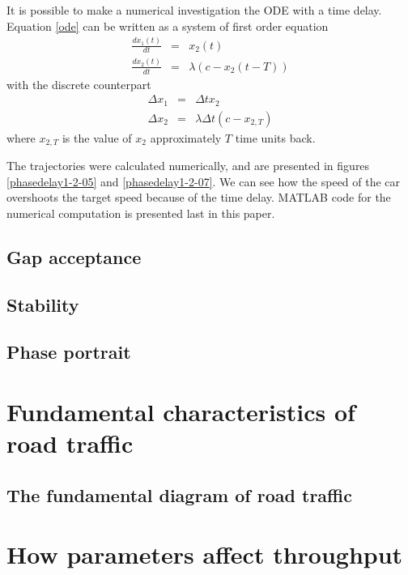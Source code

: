 \documentclass[11pt,a4paper]{article}
\begin{document}
It is possible to make a numerical investigation the ODE with a time delay.
Equation \ref{ode} can be written as a system of first order equation
\begin{eqnarray*}
\frac{dx_1(t)}{dt} &=& x_2(t) \\
\frac{dx_2(t)}{dt} &=& \lambda \left( c - x_2(t-T) \right)
\end{eqnarray*}
with the discrete counterpart
\begin{eqnarray*}
\Delta x_1 &=& \Delta t x_2 \\
\Delta x_2 &=& \lambda \Delta t ( c - x_{2,T})
\end{eqnarray*}
where $x_{2,T}$ is the value of $x_2$ approximately $T$ time units back.


The trajectories were calculated numerically, and are presented in figures
\ref{phasedelay1-2-05} and \ref{phasedelay1-2-07}. We can see how the speed of
the car overshoots the target speed because of the time delay. MATLAB code for
the numerical computation is presented last in this paper.

\subsection{Gap acceptance}
\subsection{Stability}
\subsection{Phase portrait}

\section{Fundamental characteristics of road traffic}
\subsection{The fundamental diagram of road traffic}


\section{How parameters affect throughput}
\end{document}
